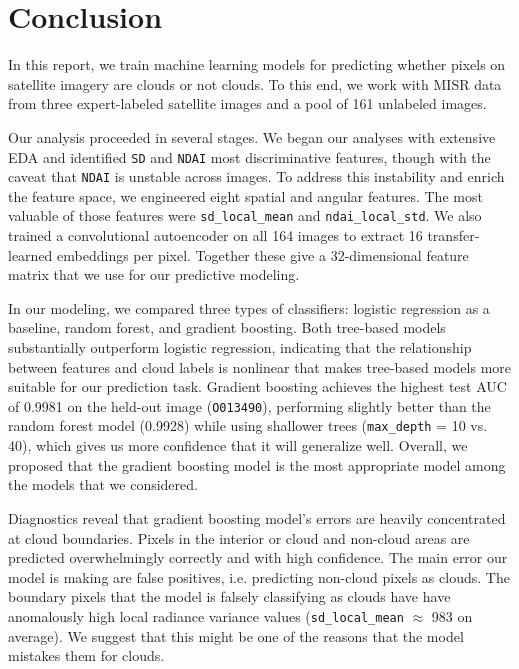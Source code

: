 \documentclass[10pt,letterpaper]{article}
\begin{document}
\section{Conclusion}

In this report, we train machine learning models for predicting whether pixels on satellite imagery are clouds or not clouds. To this end, we work with MISR data from three expert-labeled satellite images and a pool of 161 unlabeled images.

Our analysis proceeded in several stages. We began our analyses with extensive EDA and identified \texttt{SD} and \texttt{NDAI} most discriminative features, though with the caveat that \texttt{NDAI} is unstable across images. To address this instability and enrich the feature space, we engineered eight spatial and angular features. The most valuable of those features were \texttt{sd\_local\_mean} and \texttt{ndai\_local\_std}. We also trained a convolutional autoencoder on all 164 images to extract 16 transfer-learned embeddings per pixel. Together these give a 32-dimensional feature matrix that we use for our predictive modeling.

In our modeling, we compared three types of classifiers: logistic regression as a baseline, random forest, and gradient boosting. Both tree-based models substantially outperform logistic regression, indicating that the relationship between features and cloud labels is nonlinear that makes tree-based models more suitable for our prediction task. Gradient boosting achieves the highest test AUC of 0.9981 on the held-out image (\texttt{O013490}), performing slightly better than the random forest model (0.9928) while using shallower trees (\texttt{max\_depth} = 10 vs. 40), which gives us more confidence that it will generalize well. Overall, we proposed that the gradient boosting model is the most appropriate model among the models that we considered.

Diagnostics reveal that gradient boosting model's errors are heavily concentrated at cloud boundaries. Pixels in the interior or cloud and non-cloud areas are predicted overwhelmingly correctly and with high confidence. The main error our model is making are false positives, i.e. predicting non-cloud pixels as clouds. The boundary pixels that the model is falsely classifying as clouds have have anomalously high local radiance variance values (\texttt{sd\_local\_mean} $\approx$ 983 on average). We suggest that this might be one of the reasons that the model mistakes them for clouds.
\end{document}
